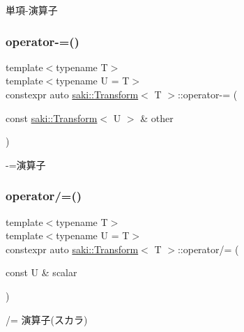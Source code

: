 単項-\/演算子 

\mbox{\label{classsaki_1_1_transform_a64731a50be44c04abd0a4cc2442ceed2}} 
\subsubsection{\texorpdfstring{operator-\/=()}{operator-=()}}
{\footnotesize\ttfamily template$<$typename T$>$ \\
template$<$typename U  = T$>$ \\
constexpr auto \mbox{\hyperlink{classsaki_1_1_transform}{saki\+::\+Transform}}$<$ T $>$\+::operator-\/= (\begin{DoxyParamCaption}\item[{const \mbox{\hyperlink{classsaki_1_1_transform}{saki\+::\+Transform}}$<$ U $>$ \&}]{other }\end{DoxyParamCaption})\hspace{0.3cm}{\ttfamily [inline]}}



-\/=演算子 

\mbox{\label{classsaki_1_1_transform_a703c619dd40015754cce34e3a73c8f14}} 
\subsubsection{\texorpdfstring{operator/=()}{operator/=()}}
{\footnotesize\ttfamily template$<$typename T$>$ \\
template$<$typename U  = T$>$ \\
constexpr auto \mbox{\hyperlink{classsaki_1_1_transform}{saki\+::\+Transform}}$<$ T $>$\+::operator/= (\begin{DoxyParamCaption}\item[{const U \&}]{scalar }\end{DoxyParamCaption})\hspace{0.3cm}{\ttfamily [inline]}}



/= 演算子(スカラ) 

\mbox{\label{classsaki_1_1_transform_acfdf423e01196edf631f272400645cfa}} 
